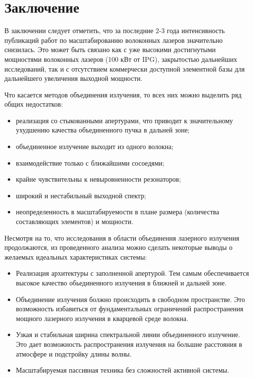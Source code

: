 
\section{Заключение}
\label{sec:anal_conclusion}

В заключении следует отметить, что за последние 2-3 года интенсивность публикаций работ по масштабированию волоконных лазеров значительно снизилась. Это может быть связано как с уже высокими достигнутыми мощностями волоконных лазеров (100 кВт от IPG), закрытостью дальнейших исследований, так и с отсутствием коммерчески доступной элементной базы для дальнейшего увеличения выходной мощности.

Что касается методов объединения излучения, то всех них можно выделить ряд общих недостатков:
\begin{itemize}
        \item реализация со стыкованными апертурами, что приводит к значительному ухудшению качества
        объединенного пучка  в дальней зоне;
        \item объединенное излучение выходит из одного волокна;
        \item взаимодействие только с ближайшими сосоедями;
        \item крайне чувствительны к невыровненности резонаторов;
        \item широкий и нестабильный выходной спектр;
        \item неопределенность в масштабируемости в плане размера (количества составляющих элементов) и мощности.
\end{itemize}

Несмотря на то, что исследования в области объединения лазерного излучения продолжаются, из проведенного анализа можно сделать некоторые выводы о желаемых идеальных характеристиках системы:
\begin{itemize}
    \item Реализация архитектуры с заполненной апертурой. Тем самым обеспечивается высокое качество обьединенного излучения в ближней и дальней зоне.
    \item Объединение излучения болжно происходить в свободном пространстве. Это возможность избавиться от фундаментальных ограничений распространения мощного лазерного излучения в кварцевой среде волокна.
    \item Узкая и стабильная ширина спектральной линии объединенного излучение. Это дает возможность распространения излучения на большие расстояния в атмосфере и подстройку длины волны.
    \item Масштабируемая пассивная техника без сложностей активной системы.
\end{itemize}

